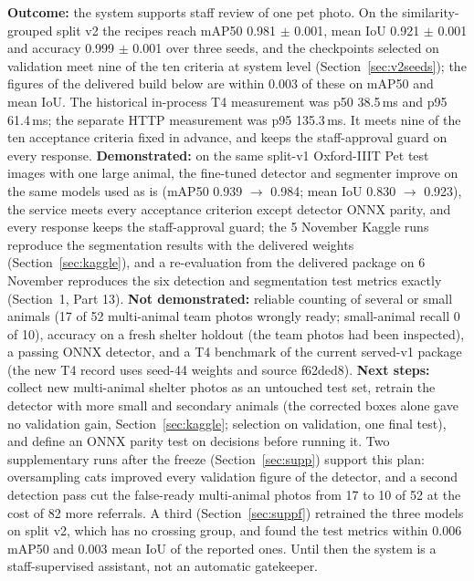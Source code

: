 \documentclass[11pt,a4paper]{article}
\begin{document}
\textbf{Outcome:} the system supports staff review of one pet photo. On the similarity-grouped split v2 the recipes reach mAP50 0.981 $\pm$ 0.001, mean IoU 0.921 $\pm$ 0.001 and accuracy 0.999 $\pm$ 0.001 over three seeds, and the checkpoints selected on validation meet nine of the ten criteria at system level (Section~\ref{sec:v2seeds}); the figures of the delivered build below are within 0.003 of these on mAP50 and mean IoU. The historical in-process T4 measurement was p50 38.5\,ms and p95 61.4\,ms; the separate HTTP measurement was p95 135.3\,ms. It meets nine of the ten acceptance criteria fixed in advance, and keeps the staff-approval guard on every response. \textbf{Demonstrated:} on the same split-v1 Oxford-IIIT Pet test images with one large animal, the fine-tuned detector and segmenter improve on the same models used as is (mAP50 0.939 $\rightarrow$ 0.984; mean IoU 0.830 $\rightarrow$ 0.923), the service meets every acceptance criterion except detector ONNX parity, and every response keeps the staff-approval guard; the 5 November Kaggle runs reproduce the segmentation results with the delivered weights (Section~\ref{sec:kaggle}), and a re-evaluation from the delivered package on 6 November reproduces the six detection and segmentation test metrics exactly (Section~1, Part 13). \textbf{Not demonstrated:} reliable counting of several or small animals (17 of 52 multi-animal team photos wrongly ready; small-animal recall 0 of 10), accuracy on a fresh shelter holdout (the team photos had been inspected), a passing ONNX detector, and a T4 benchmark of the current served-v1 package (the new T4 record uses seed-44 weights and source f62ded8). \textbf{Next steps:} collect new multi-animal shelter photos as an untouched test set, retrain the detector with more small and secondary animals (the corrected boxes alone gave no validation gain, Section~\ref{sec:kaggle}; selection on validation, one final test), and define an ONNX parity test on decisions before running it. Two supplementary runs after the freeze (Section~\ref{sec:supp}) support this plan: oversampling cats improved every validation figure of the detector, and a second detection pass cut the false-ready multi-animal photos from 17 to 10 of 52 at the cost of 82 more referrals. A third (Section~\ref{sec:suppf}) retrained the three models on split v2, which has no crossing group, and found the test metrics within 0.006 mAP50 and 0.003 mean IoU of the reported ones. Until then the system is a staff-supervised assistant, not an automatic gatekeeper.

\end{document}
